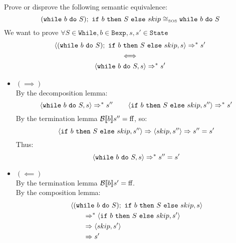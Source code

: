 \begin{exercise}{
    Prove or disprove the following semantic equivalence:
    \[ (\texttt{while}\ b\ \texttt{do}\ S);\ \texttt{if}\ b\ \texttt{then}\ S\ \texttt{else}\ skip \cong_{\text{\tiny SOS}} \texttt{while}\ b\ \texttt{do}\ S \]\vspace*{-0.6cm}
}
    We want to prove $\forall S \in \texttt{While}, b \in \texttt{Bexp}, s, s' \in \texttt{State}$
    \begin{gather*}
        \instr{(\texttt{while}\ b\ \texttt{do}\ S);\ \texttt{if}\ b\ \texttt{then}\ S\ \texttt{else}\ skip}{s} \Rightarrow^* s' \\
        \iff \\
        \instr{\texttt{while}\ b\ \texttt{do}\ S}{s} \Rightarrow^* s'
    \end{gather*}
    \begin{itemize}
        \item $(\implies)$ \vspace{0.2cm} \\
            By the decomposition lemma:\vspace*{-0.3cm}
            \[ \instr{\texttt{while}\ b\ \texttt{do}\ S}{s} \Rightarrow^* s'' \qquad \instr{\texttt{if}\ b\ \texttt{then}\ S\ \texttt{else}\ skip}{s''} \Rightarrow^* s' \]
            By the termination lemma $\mathcal{B} \llbracket b \rrbracket s'' = \text{ff}$, so:\vspace*{-0.3cm}
            \[ \instr{\texttt{if}\ b\ \texttt{then}\ S\ \texttt{else}\ skip}{s''} \Rightarrow \instr{skip}{s''} \Rightarrow s'' = s' \]
            Thus:
            \[ \instr{\texttt{while}\ b\ \texttt{do}\ S}{s} \Rightarrow^* s'' = s' \]
        \item $(\impliedby)$ \vspace{0.2cm} \\
            By the termination lemma $\mathcal{B} \llbracket b \rrbracket s' = \text{ff}$. \\
            By the composition lemma:\vspace*{-0.3cm}
            \begin{align*}
                &\instr{(\texttt{while}\ b\ \texttt{do}\ S);\ \texttt{if}\ b\ \texttt{then}\ S\ \texttt{else}\ skip}{s}
                \\&\qquad \Rightarrow^* \instr{\texttt{if}\ b\ \texttt{then}\ S\ \texttt{else}\ skip}{s'}
                \\&\qquad \Rightarrow \instr{skip}{s'}
                \\&\qquad \Rightarrow s'
            \end{align*}
    \end{itemize}
\end{exercise}
